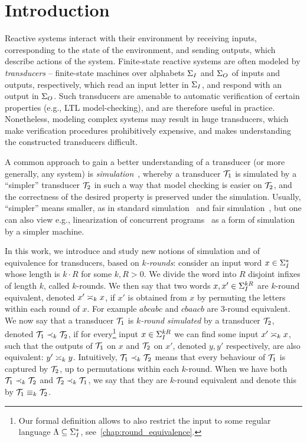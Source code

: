 \chapter{Introduction}
\label{chap:intro}

Reactive systems interact with their environment by receiving inputs, corresponding to the state of the environment, and sending outputs, which describe actions of the system. Finite-state reactive systems are often modeled by \emph{transducers} -- finite-state machines over alphabets $\sI$ and $\sO$ of inputs and outputs, respectively, which read an input letter in $\sI$, and respond with an output in $\sO$. 
Such transducers are amenable to automatic verification of certain properties (e.g., LTL model-checking), and are therefore useful in practice. Nonetheless, modeling complex systems may result in huge transducers, which make verification procedures prohibitively expensive, and makes understanding the constructed transducers difficult.

A common approach to gain a better understanding of a transducer (or more generally, any system) is \emph{simulation}~\cite{Milner1971}, whereby a transducer $\cT_1$ is simulated by a ``simpler'' transducer $\cT_2$ in such a way that model checking is easier on $\cT_2$, and the correctness of the desired property is preserved under the simulation. Usually, ``simpler'' means smaller, as in standard simulation~\cite{Milner1971} and fair simulation~\cite{Henzinger1997}, but one can also view e.g., linearization of concurrent programs~\cite{Herlihy1987} as a form of simulation by a simpler machine.

In this work, we introduce and study new notions of simulation and of equivalence for transducers, based on \emph{$k$-rounds}: consider an input word $x\in \sI^*$ whose length is $k\cdot R$ for some $k,R>0$. We divide the word into $R$ disjoint infixes of length $k$, called $k$-rounds. We then say that two words $x,x'\in \sI^{kR}$ are $k$-round equivalent, denoted $x'\req[k]x$, if $x'$ is obtained from $x$ by permuting the letters within each round of $x$. For example $abcabc$ and $cbaacb$ are $3$-round equivalent. We now say that a transducer $\cT_1$ is \emph{$k$-round simulated} by a transducer $\cT_2$, denoted $\cT_1\prec_{k} \cT_2$, if for every\footnote{Our formal definition allows to also restrict the input to some regular language $\fL\subseteq \sI^*$, see~\cref{chap:round_equivalence}.} input $x\in \sI^{kR}$ we can find some input $x'\req[k]x$, such that the outputs of $\cT_1$ on $x$ and $\cT_2$ on $x'$, denoted $y,y'$ respectively, are also equivalent: $y'\req[k] y$.
Intuitively, $\cT_1\prec_{k}\cT_2$ means that every behaviour of $\cT_1$ is captured by $\cT_2$, up to permutations within each $k$-round.
When we have both $\cT_1\prec_{k}\cT_2$ and $\cT_2\prec_{k}\cT_1$, we say that they are $k$-round equivalent and denote this by $\cT_1\equiv_{k}\cT_2$.

